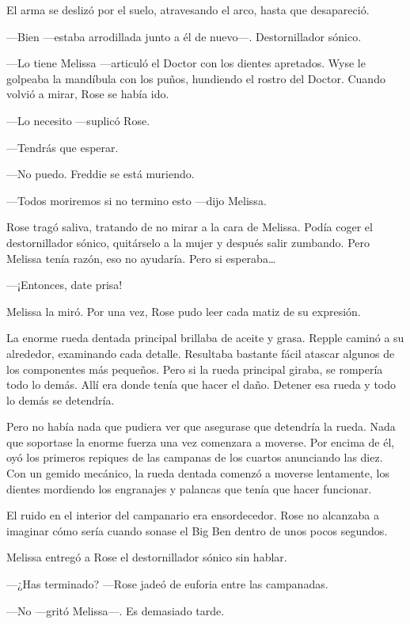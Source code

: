 {El arma se deslizó por el suelo, atravesando el arco, hasta que
desapareció.}

{---Bien ---estaba arrodillada junto a él de nuevo---. Destornillador
sónico.}

{---Lo tiene Melissa ---articuló el Doctor con los dientes apretados.
	Wyse le golpeaba la mandíbula con los puños, hundiendo el rostro del
Doctor. Cuando volvió a mirar, Rose se había ido.}

\mbox{}

{---Lo necesito ---suplicó Rose.}

{---Tendrás que esperar.}

{---No puedo. Freddie se está muriendo.}

{---Todos moriremos si no termino esto ---dijo Melissa.}

{Rose tragó saliva, tratando de no mirar a la cara de Melissa. Podía
	coger el destornillador sónico, quitárselo a la mujer y después salir
	zumbando. Pero Melissa tenía razón, eso no ayudaría. Pero si
	esperaba\ldots{}}

{---¡Entonces, date prisa!}

{Melissa la miró. Por una vez, Rose pudo leer cada matiz de su
expresión.}

{}

{La enorme rueda dentada principal brillaba de aceite y grasa. Repple
	caminó a su alrededor, examinando cada detalle. Resultaba bastante fácil
	atascar algunos de los componentes más pequeños. Pero si la rueda
	principal giraba, se rompería todo lo demás. Allí era donde tenía que
hacer el daño. Detener esa rueda y todo lo demás se detendría.}

{Pero no había nada que pudiera ver que asegurase que detendría la
	rueda. Nada que soportase la enorme fuerza una vez comenzara a moverse.
	Por encima de él, oyó los primeros repiques de las campanas de los
	cuartos anunciando las diez. Con un gemido mecánico, la rueda dentada
	comenzó a moverse lentamente, los dientes mordiendo los engranajes y
palancas que tenía que hacer funcionar.}

{El ruido en el interior del campanario era ensordecedor. Rose no
	alcanzaba a imaginar cómo sería cuando sonase el Big Ben dentro de unos
pocos segundos.}

{Melissa entregó a Rose el destornillador sónico sin hablar.}

{---¿Has terminado? ---Rose jadeó de euforia entre las campanadas.}

{---No ---gritó Melissa---. Es demasiado tarde.}

